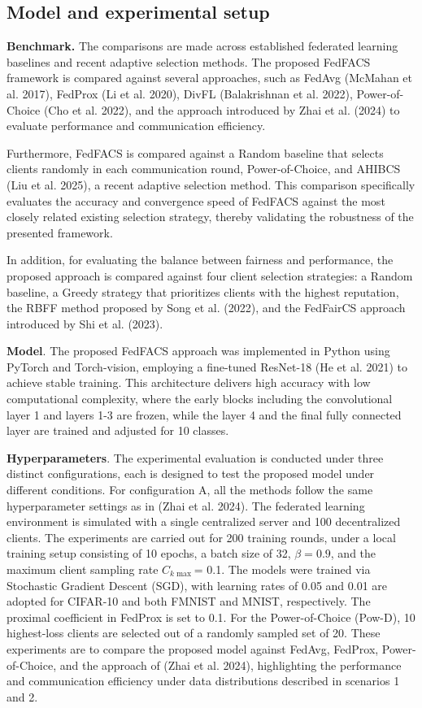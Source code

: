 \documentclass[pdflatex,sn-mathphys-num,oneside]{sn-jnl}%
\theoremstyle{thmstyleone}%
\theoremstyle{thmstyletwo}%
\theoremstyle{thmstylethree}%
\begin{document}
\subsection{Model and experimental setup}

\textbf{Benchmark.} The comparisons are made across established federated learning baselines and recent adaptive selection methods. The proposed FedFACS framework is compared against several approaches, such as FedAvg (McMahan et al. 2017), FedProx (Li et al. 2020), DivFL (Balakrishnan et al. 2022), Power-of-Choice (Cho et al. 2022), and the approach introduced by Zhai et al. (2024) to evaluate performance and communication efficiency. 

Furthermore, FedFACS is compared against a Random baseline that selects clients randomly in each communication round, Power-of-Choice, and AHIBCS (Liu et al. 2025), a recent adaptive selection method. This comparison specifically evaluates the accuracy and convergence speed of FedFACS against the most closely related existing selection strategy, thereby validating the robustness of the presented framework.

In addition, for evaluating the balance between fairness and performance, the proposed approach is compared against four client selection strategies: a Random baseline, a Greedy strategy that prioritizes clients with the highest reputation, the RBFF method proposed by Song et al. (2022), and the FedFairCS approach introduced by Shi et al. (2023).

\textbf{Model}. The proposed FedFACS approach was implemented in Python using PyTorch and Torch-vision, employing a fine-tuned ResNet-18 (He et al. 2021) to achieve stable training. This architecture delivers high accuracy with low computational complexity, where the early blocks including the convolutional layer 1 and layers 1-3 are frozen, while the layer 4 and the final fully connected layer are trained and adjusted for 10 classes.

\textbf{Hyperparameters}. The experimental evaluation is conducted under three distinct configurations, each is designed to test the proposed model under different conditions. For configuration A, all the methods follow the same hyperparameter settings as in (Zhai et al. 2024). The federated learning environment is simulated with a single centralized server and 100 decentralized clients. The experiments are carried out for 200 training rounds, under a local training setup consisting of 10 epochs, a batch size of 32, $\beta = 0.9$, and the maximum client sampling rate $C_{k\max}$= 0.1. The models were trained via Stochastic Gradient Descent (SGD), with learning rates of 0.05 and 0.01 are adopted for CIFAR-10 and both FMNIST and MNIST, respectively. The proximal coefficient in FedProx is set to 0.1. For the Power-of-Choice (Pow-D), 10 highest-loss clients are selected out of a randomly sampled set of 20. These experiments are to compare the proposed model against FedAvg, FedProx, Power-of-Choice, and the approach of (Zhai et al. 2024), highlighting the performance and communication efficiency under data distributions described in scenarios 1 and 2.
\end{document}
